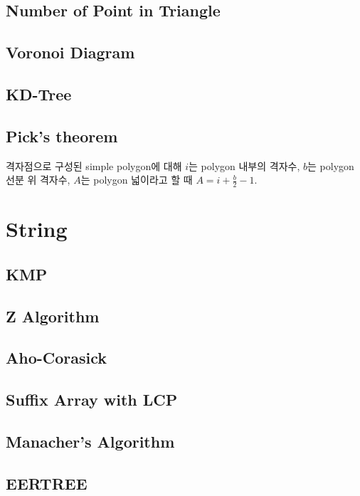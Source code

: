 \documentclass[9pt,landscape,a4paper,twocolumn]{extarticle}
\begin{document}
\subsection{Number of Point in Triangle}


\subsection{Voronoi Diagram}


\subsection{KD-Tree}


\subsection{Pick's theorem}

격자점으로 구성된 simple polygon에 대해 $i$는 polygon 내부의 격자수, $b$는 polygon 선분 위 격자수, $A$는 polygon 넓이라고 할 때 $A = i + \frac{b}{2} - 1$.

\section{String}

\subsection{KMP}


\subsection{Z Algorithm}


\subsection{Aho-Corasick}


\subsection{Suffix Array with LCP}


\subsection{Manacher's Algorithm}


\subsection{EERTREE}

\end{document}
